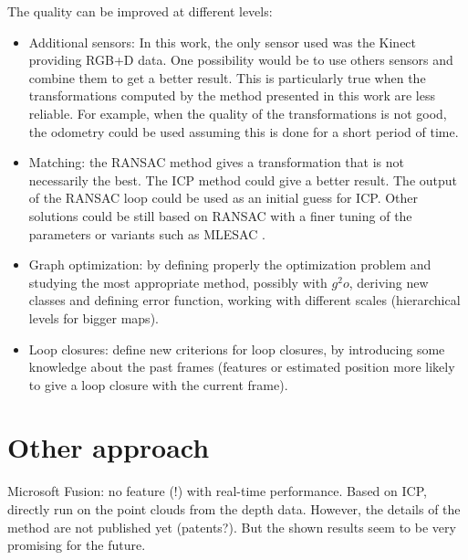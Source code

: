 The quality can be improved at different levels:
\begin{itemize}
\item Additional sensors: In this work, the only sensor used was the Kinect providing RGB+D data. One possibility would be to use others sensors and combine them to get a better result. This is particularly true when the transformations computed by the method presented in this work are less reliable. For example, when the quality of the transformations is not good, the odometry could be used assuming this is done for a short period of time.
\item Matching: the RANSAC method gives a transformation that is not necessarily the best. The ICP \cite{zhang_92_icp} method could give a better result. The output of the RANSAC loop could be used as an initial guess for ICP. Other solutions could be still based on RANSAC with a finer tuning of the parameters or variants such as MLESAC \cite{TorrZ00}.
\item Graph optimization: by defining properly the optimization problem and studying the most appropriate method, possibly with $g^2o$, deriving new classes and defining error function, working with different scales (hierarchical levels for bigger maps).
\item Loop closures: define new criterions for loop closures, by introducing some knowledge about the past frames (features or estimated position more likely to give a loop closure with the current frame).
\end{itemize}

\section{Other approach}

Microsoft Fusion: no feature (!) with real-time performance. Based on ICP, directly run on the point clouds from the depth data. However, the details of the method are not published yet (patents?). But the shown results seem to be very promising for the future.

